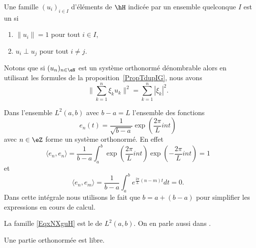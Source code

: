 \begin{definition}
    Une famille \( (u_i)_{i\in I}\) d'éléments de \( \hH\) indicée par un ensemble quelconque \( I\) est un 
     si
    \begin{enumerate}
        \item
            \( \| u_i \|=1\) pour tout \( i\in I\),
        \item
            \( u_i\perp u_j\) pour tout \( i\neq j\).
    \end{enumerate}
\end{definition}
Notons que si \( (u_n)_{n\in \eN}\) est un système orthonormé dénombrable alors en utilisant les formules de la proposition~\ref{PropTdupIG}, nous avons
\begin{equation}    \label{EqCLQbMy}
    \big\| \sum_{k=1}^n\xi_ku_k \big\|^2=\sum_{k=1}^n| \xi_k |^2.
\end{equation}

\begin{example}
    Dans l'ensemble \( L^2(a,b)\) avec \( b-a=L\) l'ensemble des fonctions
    \begin{equation}        \label{EqxNXguH}
        e_n(t)=\frac{1}{ \sqrt{b-a} }\exp(\frac{ 2\pi }{ L }int)
    \end{equation}
    avec \( n\in \eZ\) forme un système orthonormé. En effet
    \begin{equation}
        \langle e_n, e_n\rangle =\frac{1}{ b-a }\int_a^b\exp(\frac{ 2\pi }{ L }int)\exp(-\frac{ 2\pi }{ L }int)=1
    \end{equation}
    et
    \begin{equation}
        \langle e_n, e_m\rangle =\frac{1}{ b-a }\int_a^b e^{\frac{ 2\pi }{ L }(n-m)t}dt=0.
    \end{equation}
    Dans cette intégrale nous utilisons le fait que \( b=a+(b-a)\) pour simplifier les expressions en cours de calcul.

    La famille \eqref{EqxNXguH} est le  de \( L^2(a,b)\). On en parle aussi dans \cite{KuttlerTopInAl}.
\end{example}

\begin{proposition}     \label{PROPooMOQRooCPFnPC}
    Une partie orthonormée est libre.
\end{proposition}

